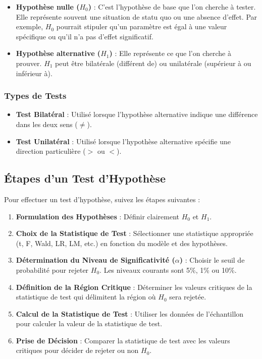 \documentclass[14pt]{extarticle} %
\theoremstyle{definition}
\theoremstyle{plain}
\begin{document}
\begin{itemize}
    \item \textbf{Hypothèse nulle (\(H_0\))} : C'est l'hypothèse de base que l'on cherche à tester. Elle représente souvent une situation de statu quo ou une absence d'effet. Par exemple, \(H_0\) pourrait stipuler qu'un paramètre est égal à une valeur spécifique ou qu'il n'a pas d'effet significatif.
    \item \textbf{Hypothèse alternative (\(H_1\))} : Elle représente ce que l'on cherche à prouver. \(H_1\) peut être bilatérale (différent de) ou unilatérale (supérieur à ou inférieur à).
\end{itemize}

\subsubsection{Types de Tests}

\begin{itemize}
    \item \textbf{Test Bilatéral} : Utilisé lorsque l'hypothèse alternative indique une différence dans les deux sens (\( \neq \)).
    \item \textbf{Test Unilatéral} : Utilisé lorsque l'hypothèse alternative spécifie une direction particulière (\( > \) ou \( < \)).
\end{itemize}

\subsection{Étapes d'un Test d'Hypothèse}

Pour effectuer un test d'hypothèse, suivez les étapes suivantes :

\begin{enumerate}[label=\textbf{\arabic*.}]
    \item \textbf{Formulation des Hypothèses} : Définir clairement \(H_0\) et \(H_1\).
    \item \textbf{Choix de la Statistique de Test} : Sélectionner une statistique appropriée (t, F, Wald, LR, LM, etc.) en fonction du modèle et des hypothèses.
    \item \textbf{Détermination du Niveau de Significativité (\(\alpha\))} : Choisir le seuil de probabilité pour rejeter \(H_0\). Les niveaux courants sont 5\%, 1\% ou 10\%.
    \item \textbf{Définition de la Région Critique} : Déterminer les valeurs critiques de la statistique de test qui délimitent la région où \(H_0\) sera rejetée.
    \item \textbf{Calcul de la Statistique de Test} : Utiliser les données de l'échantillon pour calculer la valeur de la statistique de test.
    \item \textbf{Prise de Décision} : Comparer la statistique de test avec les valeurs critiques pour décider de rejeter ou non \(H_0\).
\end{enumerate}
\end{document}
